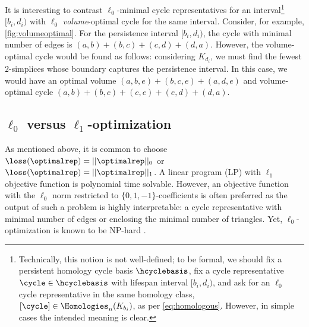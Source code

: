It is interesting to contrast $\ell_0$-minimal cycle representatives for an interval\footnote{Technically, this notion is not well-defined; to be formal, we should fix a persistent homology cycle basis $\hcyclebasis$, fix a cycle representative $\cycle \in \hcyclebasis$ with lifespan interval $[b_i, d_i)$, and ask for an $\ell_0$ cycle representative in the same homology class, $[\cycle] \in \Homologies_n(K_{b_i})$, as per \pr \eqref{eq:homologous}.  However, in simple cases the intended meaning is clear.} $[b_i, d_i)$ with  $\ell_0$ \emph{volume}-optimal cycle for the same interval.  Consider, for example, \fig \ref{fig:volumeoptimal}.  For the persistence interval $[b_i,d_i)$, the cycle with minimal number of edges is $(a,b) + (b,c) + (c,d)  + (d,a)$. However, the volume-optimal cycle would be found as follows: considering $K_{d_i}$, we must find the fewest $2$-simplices whose boundary captures the persistence interval. In this case, we would have an optimal volume  $(a,b,e) + (b,c,e) + (a,d,e)$ and volume-optimal cycle $(a,b)+ (b,c) + (c,e) + (e,d)+ (d,a)$.

\subsection{$\ell_0$ versus $\ell_1$-optimization} \label{secl0l1}

As mentioned above, it is common to choose $\loss(\optimalrep) = ||\optimalrep||_0$ or $\loss(\optimalrep) = ||\optimalrep||_1$. A linear program (LP) with $\ell_1$ objective function is polynomial time solvable. However, an objective function with the $\ell_0$ norm restricted to $\{0,1,-1\}$-coefficients is often preferred as the output of such a problem is highly interpretable: a cycle representative with minimal number of edges or enclosing the minimal number of triangles. Yet, $\ell_0$-optimization is known to be NP-hard \cite{NPhardL0}. 

